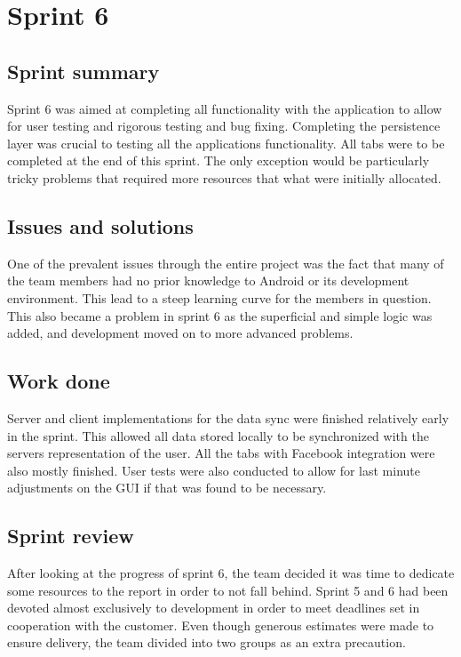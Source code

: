 \section{Sprint 6}
\subsection{Sprint summary}
Sprint 6 was aimed at completing all functionality with the application to allow for user testing and rigorous testing and bug fixing. Completing the persistence layer was crucial to testing all the applications functionality. All tabs were to be completed at the end of this sprint. The only exception would be particularly tricky problems that required more resources that what were initially allocated.


\subsection{Issues and solutions}
One of the prevalent issues through the entire project was the fact that many of the team members had no prior knowledge to Android or its development environment. This lead to a steep learning curve for the members in question. This also became a problem in sprint 6 as the superficial and simple logic was added, and development moved on to more advanced problems.

\subsection{Work done}
Server and client implementations for the data sync were finished relatively early in the sprint. This allowed all data stored locally to be synchronized with the servers representation of the user. All the tabs with Facebook integration were also mostly finished. User tests were also conducted to allow for last minute adjustments on the GUI if that was found to be necessary. 

\subsection{Sprint review}
After looking at the progress of sprint 6, the team decided it was time to dedicate some resources to the report in order to not fall behind. Sprint 5 and 6 had been devoted almost exclusively to development in order to meet deadlines set in cooperation with the customer. Even though generous estimates were made to ensure delivery, the team divided into two groups as an extra precaution. 